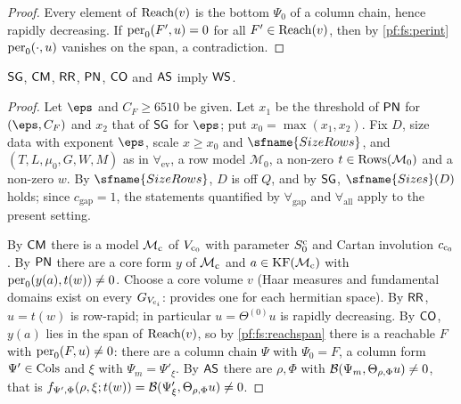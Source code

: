 \begin{proof}
Every element of $\mathrm{Reach}(v)$ is the bottom $\Psi_0$ of a column chain, hence rapidly decreasing. If $\mathrm{per}_0(F',u)=0$ for all $F'\in\mathrm{Reach}(v)$, then
by \cref{pf:fs:perint} $\mathrm{per}_0(\cdot,u)$ vanishes on the span, a contradiction.
\end{proof}

\begin{proposition}\label{pf:fs:weakSep}
$\mathsf{SG}$, $\mathsf{CM}$, $\mathsf{RR}$, $\mathsf{PN}$, $\mathsf{CO}$ and $\mathsf{AS}$ imply $\mathsf{WS}$.
\end{proposition}

\begin{proof}
Let $\eps$ and $C_F\ge6510$ be given. Let $x_1$ be the threshold of $\mathsf{PN}$ for $(\eps,C_F)$ and $x_2$ that of $\mathsf{SG}$ for
$\eps$; put $x_0=\max(x_1,x_2)$. Fix $D$, size data with exponent $\eps$, scale $x\ge x_0$ and $\sfname{SizeRows}$, and
$(T,L,\mu_0,G,W,M)$ as in $\forall_{\mathrm{ev}}$, a row model $\mathcal M_0$, a non-zero $t\in\mathrm{Rows}(\mathcal M_0)$ and a non-zero
$w$. By $\sfname{SizeRows}$, $D$ is off $Q$, and by $\mathsf{SG}$, $\sfname{Sizes}(D)$ holds; since $c_{\mathrm{gap}}=1$, the statements
quantified by $\forall_{\mathrm{gap}}$ and $\forall_{\mathrm{all}}$ apply to the present setting.

By $\mathsf{CM}$ there is a model $\mathcal M_{\mathrm{c}}$ of $V_{\mathrm{c}_0}$ with parameter $S^{\mathrm{c}}_0$ and Cartan involution $c_{\mathrm{c}_0}$. By
$\mathsf{PN}$ there are a core form $y$ of $\mathcal M_{\mathrm{c}}$ and $a\in\mathrm{KF}(\mathcal M_{\mathrm{c}})$ with $\mathrm{per}_0(y(a),t(w))\ne0$. Choose a
core volume $v$ (Haar measures and fundamental domains exist on every $G_{V_{\mathrm{c}_i}}$:
 provides one for each hermitian space). By $\mathsf{RR}$, $u=t(w)$ is row-rapid; in
particular $u=\Theta^{(0)}u$ is rapidly decreasing. By $\mathsf{CO}$, $y(a)$ lies in the span of $\mathrm{Reach}(v)$, so by \cref{pf:fs:reachspan} there is a reachable $F$ with
$\mathrm{per}_0(F,u)\ne0$: there are a column chain $\Psi$ with $\Psi_0=F$, a column form $\Psi'\in\mathrm{Cols}$ and $\xi$ with
$\Psi_m=\Psi'_\xi$. By $\mathsf{AS}$ there are $\rho,\Phi$ with $\mathcal B(\Psi_m,\Theta_{\rho,\Phi}u)\ne0$, that is
$f_{\Psi',\Phi}(\rho,\xi;t(w))=\mathcal B(\Psi'_\xi,\Theta_{\rho,\Phi}u)\neq0$.
\end{proof}

